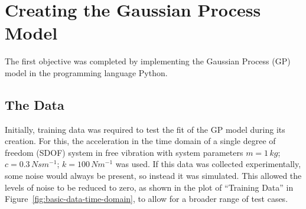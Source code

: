 \documentclass[12pt]{article}
\begin{document}
    \section{Creating the Gaussian Process Model}
    The first objective was completed by implementing the Gaussian Process (GP) model in the programming language Python.
    \subsection{The Data}
    Initially, training data was required to test the fit of the GP model during its creation.
    For this, the acceleration in the time domain of a single degree of freedom (SDOF) system in free vibration with system parameters $m = 1 \, kg$; $c = 0.3 \, Nsm^{-1}$; $k = 100 \, Nm^{-1}$ was used.
    If this data was collected experimentally, some noise would always be present, so instead it was simulated.
    This allowed the levels of noise to be reduced to zero, as shown in the plot of ``Training Data'' in Figure~\ref{fig:basic-data-time-domain}, to allow for a broader range of test cases.




%


\end{document}
